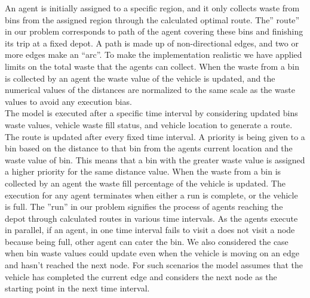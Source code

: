 \documentclass[12pt]{article}
\begin{document}
An agent is initially assigned to a specific region, and it only collects waste from bins from the assigned region through the calculated optimal route. The” route” in our problem corresponds to path of the agent covering these bins and finishing its trip at a fixed depot. A path is made up of non-directional edges, and two or more edges make an “arc”. To make the implementation realistic we have applied limits on the total waste that the agents can collect. When the waste from a bin is collected by an agent the waste value of the vehicle is updated, and the numerical values of the distances are normalized to the same scale as the waste values to avoid any execution bias.\\
The model is executed after a specific time interval by considering updated bins waste values, vehicle waste fill status, and vehicle location to generate a route. The route is updated after every fixed time interval. A priority is being given to a bin based on the distance to that bin from the agents current location and the waste value of bin. This means that a bin with the greater waste value is assigned a higher priority for the same distance value. When the waste from a bin is collected by an agent the waste fill percentage of the vehicle is updated. 
The execution for any agent terminates when either a run is complete, or the vehicle is full. The ”run” in our problem signifies the process of agents reaching the depot through calculated routes in various time intervals. As the agents execute in parallel, if an agent, in one time interval fails to visit a does not visit a node because being full, other agent can cater the bin. We also considered the case when bin waste values could update even when the vehicle is moving on an edge and hasn't reached the next node. For such scenarios the model assumes that the vehicle has completed the current edge and considers the next node as the starting point in the next time interval. 
\end{document}
